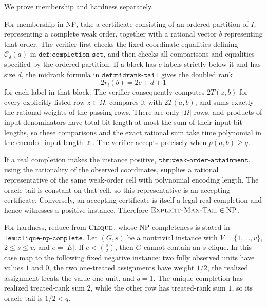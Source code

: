 We prove membership and hardness separately.

For membership in \(\mathrm{NP}\), take a certificate consisting of an ordered partition of \(I\), representing a complete weak order, together with a rational vector \(b\) representing that order.  The verifier first checks the fixed-coordinate equalities defining \(\mathcal C_\delta(a)\) in \(\texttt{def:completion-set}\), and then checks all comparisons and equalities specified by the ordered partition.  If a block has \(c\) labels strictly below it and has size \(d\), the midrank formula in \(\texttt{def:midrank-tail}\) gives the doubled rank
\[
 2r_i(b)=2c+d+1
\]
for each label in that block.  The verifier consequently computes \(2T(z,b)\) for every explicitly listed row \(z\in\Omega\), compares it with \(2T(a,b)\), and sums exactly the rational weights of the passing rows.  There are only \(|\Omega|\) rows, and products of input denominators have total bit length at most the sum of their input bit lengths, so these comparisons and the exact rational sum take time polynomial in the encoded input length \(\ell\).  The verifier accepts precisely when \(p(a,b)\ge q\).

If a real completion makes the instance positive, \(\texttt{thm:weak-order-attainment}\), using the rationality of the observed coordinates, supplies a rational representative of the same weak-order cell with polynomial encoding length.  The oracle tail is constant on that cell, so this representative is an accepting certificate.  Conversely, an accepting certificate is itself a legal real completion and hence witnesses a positive instance.  Therefore \(\textsc{Explicit-Max-Tail}\in\mathrm{NP}\).

For hardness, reduce from \(\textsc{Clique}\), whose NP-completeness is stated in \(\texttt{lem:clique-np-complete}\).  Let \((G,s)\) be a nontrivial instance with \(V=\{1,\ldots,v\}\), \(2\le s\le v\), and \(e=|E|\).  If \(e<\binom{s}{2}\), then \(G\) cannot contain an \(s\)-clique.  In this case map to the following fixed negative instance: two fully observed units have values \(1\) and \(0\), the two one-treated assignments have weight \(1/2\), the realized assignment treats the value-one unit, and \(q=1\).  The unique completion has realized treated-rank sum \(2\), while the other row has treated-rank sum \(1\), so its oracle tail is \(1/2<q\).


